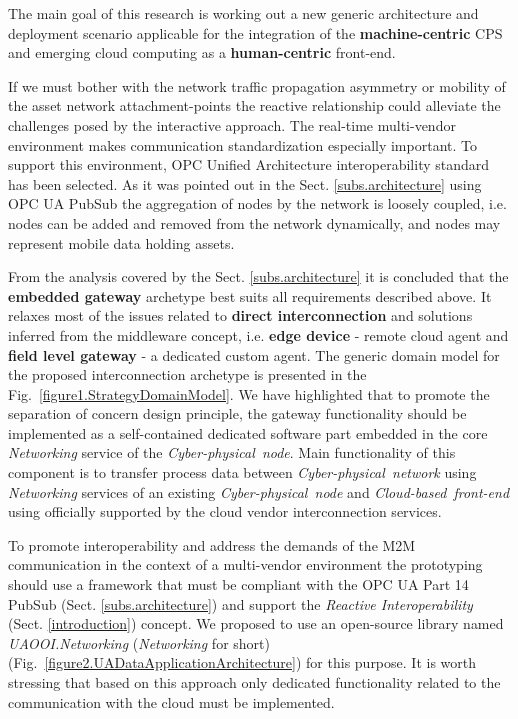 \documentclass{article}
\begin{document}
The main goal of this research is working out a new generic architecture and deployment scenario applicable for the integration of the \textbf{machine-centric} CPS and emerging cloud computing as a \textbf{human-centric} front-end.

If we must bother with the network traffic propagation asymmetry or mobility of the asset network attachment-points the reactive relationship\cite{mpostol2020} could alleviate the challenges posed by the interactive approach. The real-time multi-vendor environment makes communication standardization especially important. To support this environment, OPC Unified Architecture \cite{RefWorks:doc:5ac86c98e4b009947bbb874c} interoperability standard has been selected. As it was pointed out in the Sect. \ref*{subs.architecture} using OPC UA PubSub \cite{RefWorks:doc:5d98837de4b055984c0eecf0} the aggregation of nodes by the network is loosely coupled, i.e. nodes can be added and removed from the network dynamically, and nodes may represent mobile data holding assets.

From the analysis covered by the Sect. \ref*{subs.architecture} it is concluded that the \textbf{embedded gateway} archetype best suits all requirements described above. It relaxes most of the issues related to \textbf{direct interconnection} and solutions inferred from the middleware concept, i.e. \textbf{edge device} - remote cloud agent and \textbf{field level gateway} - a dedicated custom agent. The generic domain model for the proposed interconnection archetype is presented in the Fig.~\ref*{figure1.StrategyDomainModel}. We have highlighted that to promote the separation of concern design principle, the gateway functionality should be implemented as a self-contained dedicated software part embedded in the core \textit{Networking} service of the \textit{Cyber-physical\ node}. Main functionality of this component is to transfer process data between \textit{Cyber-physical\ network} using \textit{Networking} services of an existing \textit{Cyber-physical\ node} and \textit{Cloud-based\ front-end} using officially supported by the cloud vendor interconnection services.

To promote interoperability and address the demands of the M2M communication in the context of a multi-vendor environment the prototyping should use a framework that must be compliant with the OPC UA Part 14 PubSub (Sect. \ref*{subs.architecture}) and support the \emph{Reactive Interoperability} (Sect. \ref*{introduction}) concept. We proposed to use an open-source library named \emph{UAOOI.Networking} (\emph{Networking} for short) (Fig.~\ref*{figure2.UADataApplicationArchitecture}) for this purpose. It is worth stressing that based on this approach only dedicated functionality related to the communication with the cloud must be implemented.
\end{document}
